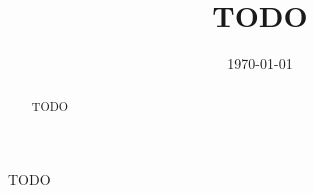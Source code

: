 \documentclass[11pt, oneside]{amsart}
\title{TODO}
\date{\today}
\begin{document}
\begin{abstract}
	TODO 
\end{abstract}
\maketitle
TODO

\appendix


\printbibliography
\end{document}
